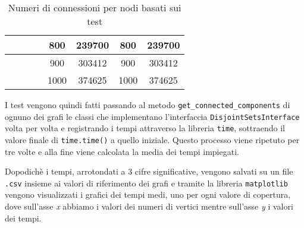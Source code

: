 \begin{table}[!h]
\begin{adjustbox}{center}
\begin{tabular}{|c|c|c|c|c|c|c|c|}
                                                         &                                          &                           &                            & 800     & 239700      & 800     & 239700      \\ \hline
                                                         &                                          &                           &                            & 900     & 303412      & 900     & 303412      \\ \hline
                                                         &                                          &                           &                            & 1000    & 374625      & 1000    & 374625      \\ \hline
            \end{tabular}
      \end{adjustbox}
      \caption{Numeri di connessioni per nodi basati sui test}
      \label{covTable}
\end{table}

I test vengono quindi fatti passando al metodo \texttt{get\_connected\_components} di ognuno dei grafi le classi che implementano
l'interfaccia \texttt{DisjointSetsInterface} volta per volta e registrando i tempi attraverso la libreria \texttt{time}, sottraendo
il valore finale di \texttt{time.time()} a quello iniziale. Questo processo viene ripetuto per tre volte e alla fine viene calcolata
la media dei tempi impiegati.\newline

Dopodichè i tempi, arrotondati a 3 cifre significative, vengono salvati su un file \texttt{.csv} insieme ai valori di riferimento dei grafi e tramite la libreria \texttt{matplotlib}
vengono visualizzati i grafici dei tempi medi, uno per ogni valore di copertura, dove sull'asse \textit{x} abbiamo i valori dei numeri di vertici mentre
sull'asse \textit{y} i valori dei tempi.


